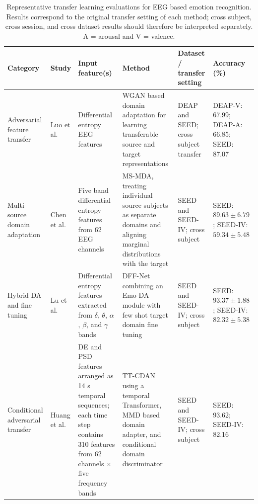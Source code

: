 \documentclass[ASNA,twocolumn]{USG}
\newcommand{\lightrowsep}{%
  \arrayrulecolor{lightrowgray}%
  \specialrule{0.30pt}{3.5pt}{3.5pt}%
  \arrayrulecolor{black}%
}
\begin{document}
\begin{table}
\centering

\caption{Representative transfer learning evaluations for EEG based emotion recognition. Results correspond to the original transfer setting of each method; cross subject, cross session, and cross dataset results should therefore be interpreted separately. A = arousal and V = valence.}
\label{tab:transfer_learning_results}

\scriptsize
\setlength{\tabcolsep}{2.5pt}
\renewcommand{\arraystretch}{1.12}

\begin{tabularx}{\textheight}{
>{\raggedright\arraybackslash}p{2.65cm}
>{\raggedright\arraybackslash}p{3.15cm}
>{\raggedright\arraybackslash}X
>{\raggedright\arraybackslash}X
>{\raggedright\arraybackslash}p{3.8cm}
>{\raggedright\arraybackslash}p{5.25cm}
}

\toprule
\textbf{Category} &
\textbf{Study} &
\textbf{Input feature(s)} &
\textbf{Method} &
\textbf{Dataset / transfer setting} &
\textbf{Accuracy (\%)} \\
\midrule

Adversarial feature transfer &
Luo et al. \cite{luo2018iconip_wganda} &
Differential entropy EEG features &
WGAN based domain adaptation for learning transferable source and target representations &
DEAP and SEED; cross subject transfer &
DEAP-V: 67.99; DEAP-A: 66.85; SEED: 87.07 \\

\lightrowsep

Multi source domain adaptation &
Chen et al. \cite{chen2021ms} &
Five band differential entropy features from 62 EEG channels &
MS-MDA, treating individual source subjects as separate domains and aligning marginal distributions with the target &
SEED and SEED-IV; cross subject &
SEED: $89.63 \pm 6.79$; SEED-IV: $59.34 \pm 5.48$ \\

\lightrowsep

Hybrid DA and fine tuning &
Lu et al. \cite{lu2023hybrid} &
Differential entropy features extracted from $\delta$, $\theta$, $\alpha$, $\beta$, and $\gamma$ bands &
DFF-Net combining an Emo-DA module with few shot target domain fine tuning &
SEED and SEED-IV; cross subject &
SEED: $93.37 \pm 1.88$; SEED-IV: $82.32 \pm 5.38$ \\

\lightrowsep

Conditional adversarial transfer &
Huang et al. \cite{huang2025novel} &
DE and PSD features arranged as 14 s temporal sequences; each time step contains 310 features from 62 channels $\times$ five frequency bands &
TT-CDAN using a temporal Transformer, MMD based domain adapter, and conditional domain discriminator &
SEED and SEED-IV; cross subject &
SEED: 93.62; SEED-IV: 82.16 \\


\end{tabularx}
\end{table}
\end{document}
